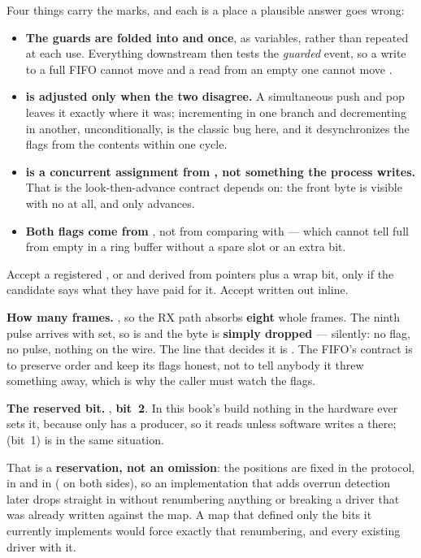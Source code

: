 Four things carry the marks, and each is a place a plausible answer goes wrong:
\begin{itemize}
  \item \textbf{The guards are folded into  and  once}, as variables, rather
    than repeated at each use. Everything downstream then tests the \emph{guarded} event, so a write
    to a full FIFO cannot move  and a read from an empty one cannot move .
  \item \textbf{ is adjusted only when the two disagree.} A simultaneous push and pop
    leaves it exactly where it was; incrementing in one branch and decrementing in another,
    unconditionally, is the classic bug here, and it desynchronizes the flags from the contents
    within one cycle.
  \item \textbf{ is a concurrent assignment from , not something the process
    writes.} That is the look-then-advance contract  depends on: the front byte is visible
    with no  at all, and  only advances.
  \item \textbf{Both flags come from }, not from comparing  with 
    --- which cannot tell full from empty in a ring buffer without a spare slot or an extra bit.
\end{itemize}
Accept a registered , or  and  derived from pointers plus a wrap
bit, only if the candidate says what they have paid for it. Accept  written out
inline.

\textbf{How many frames.} , so the RX path absorbs \textbf{eight} whole frames. The
ninth  pulse arrives with  set, so  is  and the byte
is \textbf{simply dropped} --- silently: no flag, no pulse, nothing on the wire. The line that
decides it is . The FIFO's contract is to preserve order and keep
its flags honest, not to tell anybody it threw something away, which is why the caller must watch
the flags.

\textbf{The reserved bit.} , \textbf{ bit~2}. In this book's
build nothing in the hardware ever sets it, because only  has a producer, so it reads
 unless software writes a  there;  (bit~1) is in the same situation.

That is a \textbf{reservation, not an omission}: the positions are fixed in the protocol, in
 and in  ( on both sides), so an
implementation that adds overrun detection later drops straight in without renumbering anything or
breaking a driver that was already written against the map. A map that defined only the bits it
currently implements would force exactly that renumbering, and every existing driver with it.

